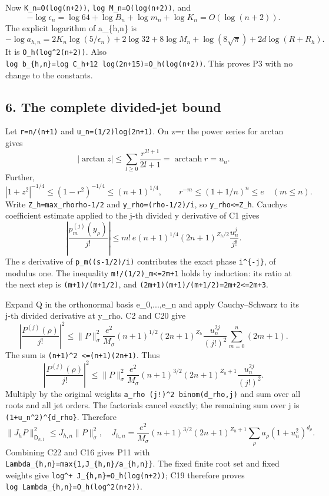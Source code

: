 \documentclass[11pt]{article}
\begin{document}
Now \texttt{K\_n=O(log(n+2))}, \texttt{log\ M\_n=O(log(n+2))}, and \[
-\log\epsilon_n=
\log64+\log B_n+\log m_n+\log K_n=O(\log(n+2)).
\] The explicit logarithm of a\_\{h,n\} is \[
-\log a_{h,n}=
2K_n\log(5/\epsilon_n)+2\log32+8\log M_n
+\log(8\sqrt\pi)+2d\log(R+R_h).
\tag{C19}
\] It is \texttt{O\_h(log\^{}2(n+2))}. Also \texttt{log\ b\_\{h,n\}=log\ C\_h+12\ log(2n+15)=O\_h(log(n+2))}. This proves P3 with no change to the constants.

\subsection{6. The complete divided-jet bound}\label{mrcoerc:the-complete-divided-jet-bound}

Let \texttt{r=n/(n+1)} and \texttt{u\_n=(1/2)log(2n+1)}. On \textbar z\textbar=r the power series for arctan gives \[
|\arctan z|\le\sum_{l\ge0}\frac{r^{2l+1}}{2l+1}
=\operatorname{arctanh}r=u_n.
\] Further, \[
|1+z^2|^{-1/4}\le(1-r^2)^{-1/4}\le(n+1)^{1/4},
\qquad r^{-m}\le(1+1/n)^n\le e\quad(m\le n).
\] Write \texttt{Z\_h=max\_rho\textbar{}rho-1/2\textbar{}} and \texttt{y\_rho=(rho-1/2)/i}, so \texttt{\textbar{}y\_rho\textbar{}\textless{}=Z\_h}. Cauchy\textquotesingle s coefficient estimate applied to the j-th divided y derivative of C1 gives \[
\left|\frac{p_m^{(j)}(y_\rho)}{j!}\right|
\le m!\,e(n+1)^{1/4}(2n+1)^{Z_h/2}\frac{u_n^j}{j!}.
\tag{C20}
\] The s derivative of \texttt{p\_m((s-1/2)/i)} contributes the exact phase \texttt{i\^{}\{-j\}}, of modulus one. The inequality \texttt{m!/(1/2)\_m\textless{}=2m+1} holds by induction: its ratio at the next step is \texttt{(m+1)/(m+1/2)}, and \texttt{(2m+1)(m+1)/(m+1/2)=2m+2\textless{}=2m+3}.

Expand Q in the orthonormal basis e\_0,...,e\_n and apply Cauchy--Schwarz to its j-th divided derivative at y\_rho. C2 and C20 give \[
\left|\frac{P^{(j)}(\rho)}{j!}\right|^2
\le\|P\|_\sigma^2\frac{e^2}{M_\sigma}(n+1)^{1/2}
(2n+1)^{Z_h}\frac{u_n^{2j}}{(j!)^2}
 \sum_{m=0}^n(2m+1).
\] The sum is \texttt{(n+1)\^{}2\ \textless{}=(n+1)(2n+1)}. Thus \[
\left|\frac{P^{(j)}(\rho)}{j!}\right|^2
\le\|P\|_\sigma^2\frac{e^2}{M_\sigma}(n+1)^{3/2}
(2n+1)^{Z_h+1}\frac{u_n^{2j}}{(j!)^2}.
\tag{C21}
\] Multiply by the original weights \texttt{a\_rho\ (j!)\^{}2\ binom(d\_rho,j)} and sum over all roots and all jet orders. The factorials cancel exactly; the remaining sum over j is \texttt{(1+u\_n\^{}2)\^{}\{d\_rho\}}. Therefore \[
\|J_hP\|_{\mathsf D_{h,1}}^2\le J_{h,n}\|P\|_\sigma^2,
\quad
J_{h,n}=\frac{e^2}{M_\sigma}(n+1)^{3/2}(2n+1)^{Z_h+1}
 \sum_\rho a_\rho(1+u_n^2)^{d_\rho}.
\tag{C22}
\] Combining C22 and C16 gives P11 with \texttt{Lambda\_\{h,n\}=max\{1,J\_\{h,n\}/a\_\{h,n\}\}}. The fixed finite root set and fixed weights give \texttt{log\^{}+\ J\_\{h,n\}=O\_h(log(n+2))}; C19 therefore proves \texttt{log\ Lambda\_\{h,n\}=O\_h(log\^{}2(n+2))}.
\end{document}
